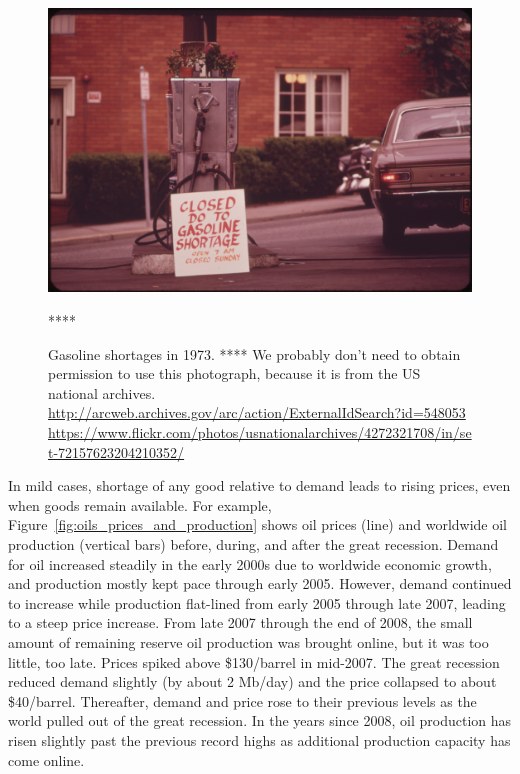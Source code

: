 \begin{figure}[!ht]
\centering\
\includegraphics[width=\linewidth]{Part_0/Chapter_Introduction/images/gas_shortage_1973.jpg}
\caption[Gasoline shortage]{Gasoline shortages in 1973.
**** We probably don't need to obtain permission to use this photograph, because
it is from the US national archives.
\url{http://arcweb.archives.gov/arc/action/ExternalIdSearch?id=548053}
\url{https://www.flickr.com/photos/usnationalarchives/4272321708/in/set-72157623204210352/}}
****
\label{fig:gas_shortage}
\end{figure}

In mild cases,
shortage of any good relative to demand leads to rising prices,
even when goods remain available.
For example,
Figure~\ref{fig:oils_prices_and_production} shows oil prices (line) and 
worldwide oil production (vertical bars) 
before, during, and after the great recession. 
Demand for oil increased steadily in the early 2000s
due to worldwide economic growth, 
and production mostly kept pace through early 2005.
However, demand continued to increase while 
production flat-lined from early 2005 through late 2007, 
leading to a steep price increase.
From late 2007 through the end of 2008, 
the small amount of remaining reserve oil production was brought online,
but it was too little, too late.
Prices spiked above \$130/barrel in mid-2007. 
The great recession reduced demand slightly (by about 2 Mb/day)
and the price collapsed to about \$40/barrel.
Thereafter, demand and price rose to their previous levels 
as the world pulled out of the great recession.
In the years since 2008, oil production has risen slightly past the previous record highs
as additional production capacity has come online.

